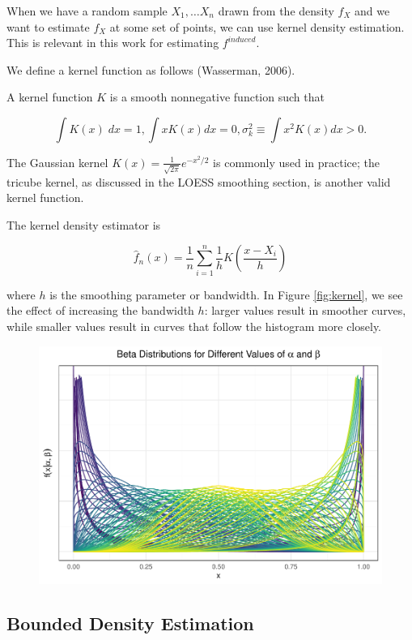 \documentclass[12pt,twoside]{smiththesis}
\begin{document}
When we have a random sample \(X_1,\dots X_n\) drawn from the density \(f_X\) and we want to estimate \(f_X\) at some set of points, we can use kernel density estimation. This is relevant in this work for estimating \(f^{induced}\).

We define a kernel function as follows (Wasserman, 2006).
\begin{tcolorbox}[title=Definition: Kernel Function]

A kernel function $K$ is a smooth nonnegative function such that 

$$\int K(x) \; dx = 1, \int x K(x) dx = 0, \sigma^2_k \equiv \int x^2 K(x) dx > 0.$$ 
\end{tcolorbox}
The Gaussian kernel \(K(x) = \frac{1}{\sqrt{2\pi}}e^{-x^2/2}\) is commonly used in practice; the tricube kernel, as discussed in the LOESS smoothing section, is another valid kernel function.

The kernel density estimator is

\[\hat f_n(x) = \frac 1n \sum_{i=1}^n \frac 1h K\left(\dfrac{x-X_i}{h} \right)\]

where \(h\) is the smoothing parameter or bandwidth. In Figure \ref{fig:kernel}, we see the effect of increasing the bandwidth \(h\): larger values result in smoother curves, while smaller values result in curves that follow the histogram more closely.
\begin{figure}

{\centering \includegraphics{thesis_files/figure-latex/unnamed-chunk-33-1} 

}

\caption{\label{fig:kernel}}\label{fig:unnamed-chunk-33}
\end{figure}
\hypertarget{bounded-density-estimation}{%
\subsection{Bounded Density Estimation}\label{bounded-density-estimation}}
\end{document}
